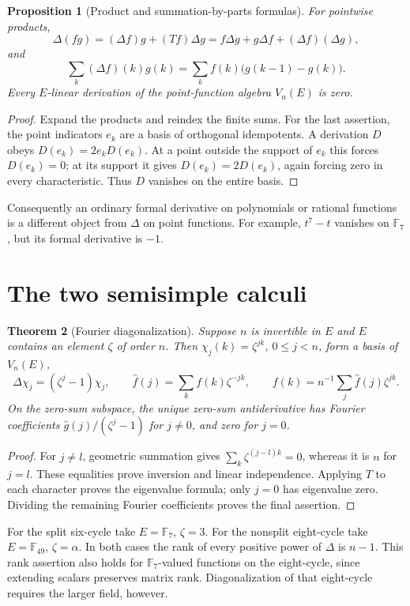 \documentclass[11pt]{article}
\newtheorem{theorem}{Theorem}[section]
\newtheorem{proposition}[theorem]{Proposition}
\theoremstyle{definition}
\theoremstyle{remark}
\newcommand{\F}{\mathbb F}
\begin{document}
\begin{proposition}[Product and summation-by-parts formulas]
\label{prop:products}
For pointwise products,
\[
 \Delta(fg)=(\Delta f)g+(Tf)\Delta g
          =f\Delta g+g\Delta f+(\Delta f)(\Delta g),
\]
and
\[
 \sum_k (\Delta f)(k)g(k)
    =\sum_k f(k)\bigl(g(k-1)-g(k)\bigr).
\]
Every $E$-linear derivation of the point-function algebra $V_n(E)$ is zero.
\end{proposition}
\begin{proof}
Expand the products and reindex the finite sums. For the last assertion,
the point indicators $e_k$ are a basis of orthogonal idempotents. A derivation
$D$ obeys $D(e_k)=2e_kD(e_k)$. At a point outside the support of $e_k$ this
forces $D(e_k)=0$; at its support it gives $D(e_k)=2D(e_k)$, again forcing
zero in every characteristic. Thus $D$ vanishes on the entire basis.
\end{proof}
Consequently an ordinary formal derivative on polynomials or rational
functions is a different object from $\Delta$ on point functions. For example,
$t^7-t$ vanishes on $\F_7$, but its formal derivative is $-1$.

\section{The two semisimple calculi}\label{sec:semisimple}
\begin{theorem}[Fourier diagonalization]\label{thm:fourier}
Suppose $n$ is invertible in $E$ and $E$ contains an element $\zeta$ of order
$n$. Then $\chi_j(k)=\zeta^{jk}$, $0\le j<n$, form a basis of $V_n(E)$,
\[
 \Delta\chi_j=(\zeta^j-1)\chi_j,\qquad
 \widehat f(j)=\sum_k f(k)\zeta^{-jk},\qquad
 f(k)=n^{-1}\sum_j\widehat f(j)\zeta^{jk}.
\]
On the zero-sum subspace, the unique zero-sum antiderivative has Fourier
coefficients $\widehat g(j)/(\zeta^j-1)$ for $j\ne0$, and zero for $j=0$.
\end{theorem}
\begin{proof}
For $j\ne l$, geometric summation gives
$\sum_k\zeta^{(j-l)k}=0$, whereas it is $n$ for $j=l$.
These equalities prove inversion and linear independence. Applying $T$ to
each character proves the eigenvalue formula; only $j=0$ has eigenvalue zero.
Dividing the remaining Fourier coefficients proves the final assertion.
\end{proof}

For the split six-cycle take $E=\F_7$, $\zeta=3$. For the nonsplit eight-cycle
take $E=\F_{49}$, $\zeta=\alpha$. In both cases the rank of every positive
power of $\Delta$ is $n-1$. This rank assertion also holds for $\F_7$-valued
functions on the eight-cycle, since extending scalars preserves matrix rank.
Diagonalization of that eight-cycle requires the larger field, however.
\end{document}
